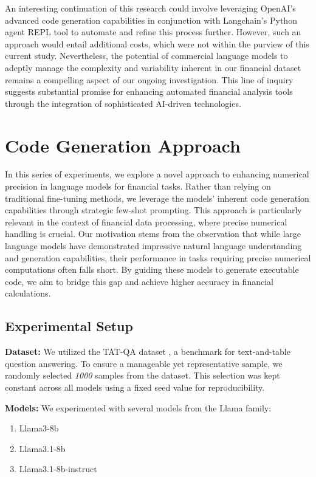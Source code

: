 \documentclass[logo,msc]{infthesis}           %
\begin{document}
An interesting continuation of this research could involve leveraging OpenAI's advanced code generation capabilities in conjunction with Langchain's Python agent REPL tool to automate and refine this process further. However, such an approach would entail additional costs, which were not within the purview of this current study. Nevertheless, the potential of commercial language models to adeptly manage the complexity and variability inherent in our financial dataset remains a compelling aspect of our ongoing investigation. This line of inquiry suggests substantial promise for enhancing automated financial analysis tools through the integration of sophisticated AI-driven technologies.

\section{Code Generation Approach}
In this series of experiments, we explore a novel approach to enhancing numerical precision in language models for financial tasks. Rather than relying on traditional fine-tuning methods, we leverage the models' inherent code generation capabilities through strategic few-shot prompting. This approach is particularly relevant in the context of financial data processing, where precise numerical handling is crucial.
Our motivation stems from the observation that while large language models have demonstrated impressive natural language understanding and generation capabilities, their performance in tasks requiring precise numerical computations often falls short. By guiding these models to generate executable code, we aim to bridge this gap and achieve higher accuracy in financial calculations.

\subsection{Experimental Setup}

\textbf{Dataset:} We utilized the TAT-QA dataset \cite{zhu-etal-2021-tat}, a benchmark for text-and-table question answering. To ensure a manageable yet representative sample, we randomly selected \textit{1000} samples from the dataset. This selection was kept constant across all models using a fixed seed value for reproducibility.

\textbf{Models:} We experimented with several models from the Llama family:
\begin{enumerate}
    \item Llama3-8b
    \item Llama3.1-8b
    \item Llama3.1-8b-instruct
\end{enumerate}
\end{document}
